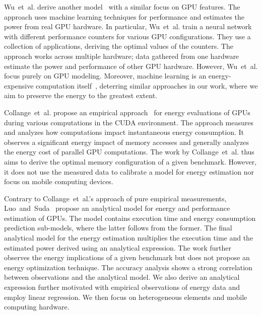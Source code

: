 Wu~et~al. derive another model~\citep{wu2015gpgpu} with a similar focus on GPU features. The approach uses machine learning techniques for performance and estimates the power from real GPU hardware. In particular, Wu~et~al. train a neural network with different performance counters for various GPU configurations. They use a collection of applications, deriving the optimal values of the counters. The approach works across multiple hardware; data gathered from one hardware estimate the power and performance of other GPU hardware. However, Wu~et~al. focus purely on GPU modeling. Moreover, machine learning is an energy-expensive computation itself~\citep{garcia2019estimation,yang2017method}, deterring similar approaches in our work, where we aim to preserve the energy to the greatest extent.

Collange~et~al. propose an empirical approach~\citep{collange2009power} for energy evaluations of GPUs during various computations in the CUDA environment. The approach measures and analyzes how computations impact instantaneous energy consumption. It observes a significant energy impact of memory accesses and generally analyzes the energy cost of parallel GPU computations. The work by Collange~et~al. thus aims to derive the optimal memory configuration of a given benchmark. However, it does not use the measured data to calibrate a model for energy estimation nor focus on mobile computing devices.

Contrary to Collange~et~al.'s approach of pure empirical measurements, Luo~and~Suda~\citep{luo2011performance} propose an analytical model for energy and performance estimation of GPUs. The model contains execution time and energy consumption prediction sub-models, where the latter follows from the former. The final analytical model for the energy estimation multiplies the execution time and the estimated power derived using an analytical expression. The work further observes the energy implications of a given benchmark but does not propose an energy optimization technique. The accuracy analysis
shows a strong correlation between observations and the analytical model. We also derive an analytical expression further motivated with empirical observations of energy data and employ linear regression. We then focus on heterogeneous elements and mobile computing hardware.

